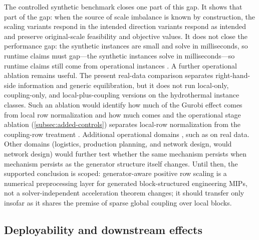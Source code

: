 \documentclass[AMA,Times1COL]{WileyNJDv5} %
\providecommand{\DIFadd}[1]{{\protect\color{blue} \sf #1}} %
\providecommand{\DIFdel}[1]{{\protect\color{red} \scriptsize #1}} %
\providecommand{\DIFaddbegin}{} %
\providecommand{\DIFaddend}{} %
\providecommand{\DIFdelbegin}{} %
\providecommand{\DIFdelend}{} %
\begin{document}
The controlled synthetic benchmark closes \DIFdelbegin \DIFdel{one part of this gap. It shows that }\DIFdelend \DIFaddbegin \DIFadd{part of the gap: }\DIFaddend when the source of \DIFdelbegin \DIFdel{scale }\DIFdelend imbalance is known
by construction, the \DIFdelbegin \DIFdel{scaling variants respond in the
intended direction }\DIFdelend \DIFaddbegin \DIFadd{variants respond as intended }\DIFaddend and preserve original-scale feasibility and
objective values. It does not close the performance \DIFdelbegin \DIFdel{gap: the synthetic instances are small and solve in
milliseconds,
so runtime claims must }\DIFdelend \DIFaddbegin \DIFadd{gap---the synthetic instances solve in
milliseconds---so runtime claims }\DIFaddend still come from operational instances\DIFdelbegin \DIFdel{. A further operational ablation remains useful. The present real-data comparison separates right-hand-side information and generic equilibration, but it does not run local-only}\DIFdelend , \DIFdelbegin \DIFdel{coupling-only, and local-plus-coupling versions on the hydrothermal instance classes. Such an ablation would identify how much of the Gurobi effect comes from local row normalization and how much comes }\DIFdelend \DIFaddbegin \DIFadd{and the operational
stage ablation (\cref{subsec:added-controls}) separates local-row normalization }\DIFaddend from the
coupling-row treatment \DIFdelbegin \DIFdel{. Additional operational
domains , such as }\DIFdelend \DIFaddbegin \DIFadd{on real data. Other domains (}\DIFaddend logistics, production planning, \DIFdelbegin \DIFdel{and network
design, would }\DIFdelend \DIFaddbegin \DIFadd{network
design) would further }\DIFaddend test whether the \DIFdelbegin \DIFdel{same mechanism persists when }\DIFdelend \DIFaddbegin \DIFadd{mechanism persists as }\DIFaddend the generator structure \DIFdelbegin \DIFdel{itself changes. Until then, the
supported conclusion is scoped: generator-aware positive row
scaling is a numerical
preprocessing layer for generated block-structured engineering MIPs, not a
solver-independent acceleration theorem}\DIFdelend \DIFaddbegin \DIFadd{changes; it
should transfer only insofar as it shares the premise of sparse global coupling over local blocks.
}

\subsection{\DIFadd{Deployability and downstream effects}}
\label{subsec:deployability}
\end{document}
